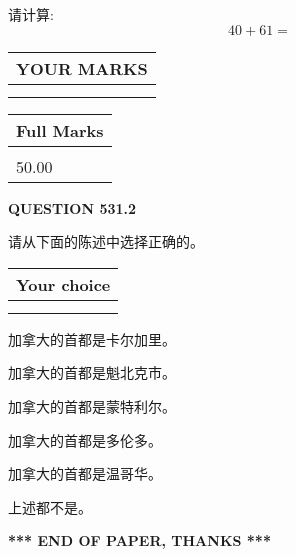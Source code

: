 \documentclass{ctexart}
\begin{document}
  
 
请计算:
\begin{equation}
40 +  %
61 = \nonumber
\end{equation}
 

 

 
  
\vspace{0.2in}
  
\noindent\begin{tabular}{|l|}
\hline
 YOUR MARKS  \\
\hline
 \\ 
 \\ 
\hline
\end{tabular}
\hspace{0.05in} \begin{tabular}{|l|}
\hline
 Full Marks  \\
\hline
 \\ 
50.00 \\
\hline
\end{tabular}
{\textbf{\Large{QUESTION
531.2 
}}}
  
  
请从下面的陈述中选择正确的。
  
  
\noindent\hspace{3.0in} \begin{tabular}{|l|}
\hline
Your choice \\
\hline
 \\ 
 \\ 
\hline
\end{tabular}
  
  
 
 
加拿大的首都是卡尔加里。
 
 
加拿大的首都是魁北克市。
 
 
加拿大的首都是蒙特利尔。
 
 
加拿大的首都是多伦多。
 
 
加拿大的首都是温哥华。
 
 
 上述都不是。
 
 
   
   
 \vspace{0.2in}
 
   
   
   
   
\vspace{1.0in} 
{\textbf{\large{ *** END OF PAPER, THANKS *** }}} 
   
\end{document}
